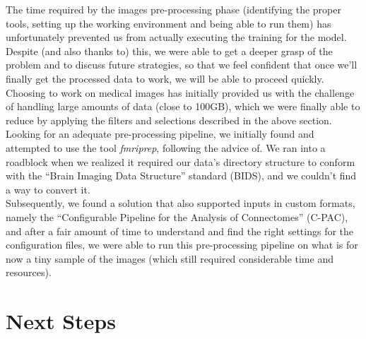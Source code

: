 \documentclass{article}
\begin{document}
The time required by the images pre-processing phase (identifying the proper tools, setting up the working environment and being able to run them) has unfortunately prevented us from actually executing the training for the model.\\

Despite (and also thanks to) this, we were able to get a deeper grasp of the problem and to discuss future strategies, so that we feel confident that once we'll finally get the processed data to work, we will be able to proceed quickly.\\

Choosing to work on medical images has initially provided us with the challenge of handling large amounts of data (close to 100GB), which we were finally able to reduce by applying the filters and selections described in the above section. Looking for an adequate pre-processing pipeline, we initially found and attempted to use the tool \textit{fmriprep}\cite{fmriprep}, following the advice of\cite{andysbrainbook}. We ran into a roadblock when we realized it required our data's directory structure to conform with the ``Brain Imaging Data Structure'' standard (BIDS)\cite{bids}, and we couldn't find a way to convert it.\\

Subsequently, we found a solution that also supported inputs in custom formats, namely the ``Configurable Pipeline for the Analysis of Connectomes'' (C-PAC)\cite{cpac}, and after a fair amount of time to understand and find the right settings for the configuration files, we were able to run this pre-processing pipeline on what is for now a tiny sample of the images (which still required considerable time and resources).

\section{Next Steps}
\end{document}
